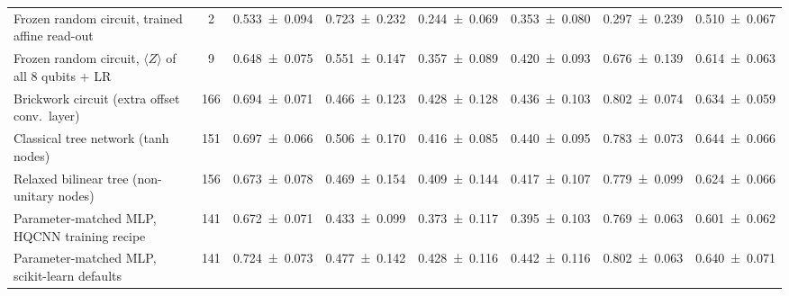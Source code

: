 \begin{table}[tbp]
\begin{tabular}{>{\raggedright\arraybackslash}p{3.6cm}ccccccc}
Frozen random circuit, trained affine read-out & \num{2} & \num{0.533 \pm 0.094} & \num{0.723 \pm 0.232} & \num{0.244 \pm 0.069} & \num{0.353 \pm 0.080} & \num{0.297 \pm 0.239} & \num{0.510 \pm 0.067} \\
Frozen random circuit, $\langle Z\rangle$ of all 8 qubits + LR & \num{9} & \num{0.648 \pm 0.075} & \num{0.551 \pm 0.147} & \num{0.357 \pm 0.089} & \num{0.420 \pm 0.093} & \num{0.676 \pm 0.139} & \num{0.614 \pm 0.063} \\
Brickwork circuit (extra offset conv.\ layer) & \num{166} & \num{0.694 \pm 0.071} & \num{0.466 \pm 0.123} & \num{0.428 \pm 0.128} & \num{0.436 \pm 0.103} & \num{0.802 \pm 0.074} & \num{0.634 \pm 0.059} \\
Classical tree network (tanh nodes) & \num{151} & \num{0.697 \pm 0.066} & \num{0.506 \pm 0.170} & \num{0.416 \pm 0.085} & \num{0.440 \pm 0.095} & \num{0.783 \pm 0.073} & \num{0.644 \pm 0.066} \\
Relaxed bilinear tree (non-unitary nodes) & \num{156} & \num{0.673 \pm 0.078} & \num{0.469 \pm 0.154} & \num{0.409 \pm 0.144} & \num{0.417 \pm 0.107} & \num{0.779 \pm 0.099} & \num{0.624 \pm 0.066} \\
Parameter-matched MLP, HQCNN training recipe & \num{141} & \num{0.672 \pm 0.071} & \num{0.433 \pm 0.099} & \num{0.373 \pm 0.117} & \num{0.395 \pm 0.103} & \num{0.769 \pm 0.063} & \num{0.601 \pm 0.062} \\
Parameter-matched MLP, scikit-learn defaults & \num{141} & \num{0.724 \pm 0.073} & \num{0.477 \pm 0.142} & \num{0.428 \pm 0.116} & \num{0.442 \pm 0.116} & \num{0.802 \pm 0.063} & \num{0.640 \pm 0.071} \\
\bottomrule
\end{tabular}
\par{}
\end{table}
